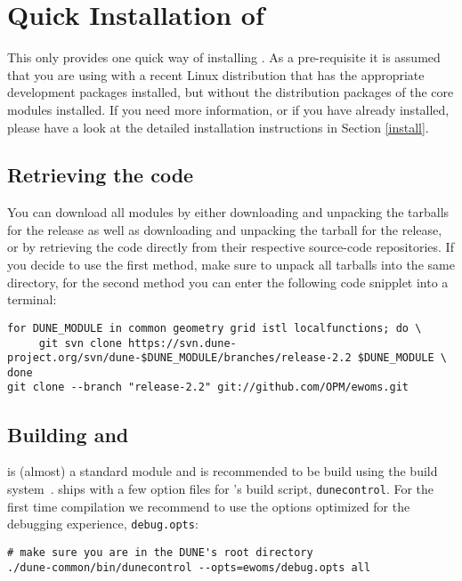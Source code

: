 \section{Quick Installation of \eWoms} \label{quick-install}

This only provides one quick way of installing \eWoms.  As a
pre-requisite it is assumed that you are using \eWoms with a recent
Linux distribution that has the appropriate development packages
installed, but without the distribution packages of the \Dune core
modules installed.  If you need more information, or if you have \Dune
already installed, please have a look at the detailed installation
instructions in Section \ref{install}.

\subsection{Retrieving the code}


You can download all \Dune modules by either downloading and unpacking
the tarballs for the  release as well as downloading and
unpacking the tarball for the  release, or by retrieving the
code directly from their respective source-code repositories. If you
decide to use the first method, make sure to unpack all tarballs into
the same directory, for the second method you can enter the following
code snipplet into a terminal:
\begin{lstlisting}[style=Bash]
for DUNE_MODULE in common geometry grid istl localfunctions; do \
     git svn clone https://svn.dune-project.org/svn/dune-$DUNE_MODULE/branches/release-2.2 $DUNE_MODULE \
done
git clone --branch "release-2.2" git://github.com/OPM/ewoms.git
\end{lstlisting}

\subsection{Building \Dune and \eWoms}
\label{buildIt}

\eWoms is (almost) a standard \Dune module and is recommended to be
build using the \Dune build system~\cite{DUNE-BS}. \eWoms ships with a
few option files for \Dune's build script, \texttt{dunecontrol}. For
the first time compilation we recommend to use the options optimized
for the debugging experience, \texttt{debug.opts}:

\begin{lstlisting}[style=Bash]
# make sure you are in the DUNE's root directory 
./dune-common/bin/dunecontrol --opts=ewoms/debug.opts all
\end{lstlisting}

